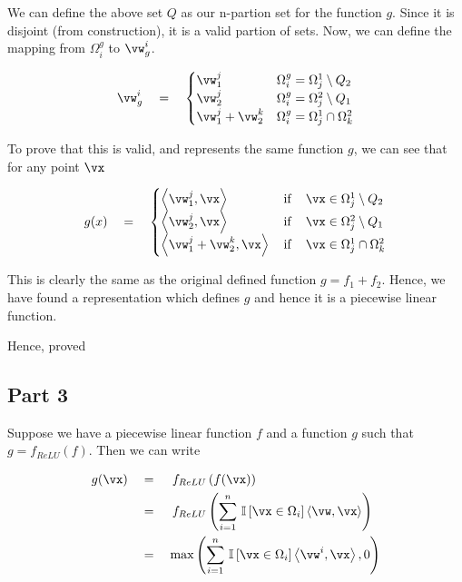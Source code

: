 \documentclass{article}
\begin{document}
\begin{mlsolution}
\begin{addmargin}{1.5em}
		 \br%

		We can define the above set $Q$ as our n-partion set for the function $g$. Since it is disjoint (from construction), it is a valid partion of sets. Now, we can define the mapping from $\Omega_i^g$ to $\vw_g^i$.

		\begin{align*}
			\vw_g^i	\eq \begin{cases}
				\vw_1^j				&	\Omega_i^g = \Omega_j^1 \setminus Q_2 \\
				\vw_2^j				&	\Omega_i^g = \Omega_j^2 \setminus Q_1 \\
				\vw_1^j + \vw_2^k	&	\Omega_i^g = \Omega_j^1 \cap \Omega_k^2
			\end{cases}
		\end{align*}

		To prove that this is valid, and represents the same function $g$, we can see that for any point $\vx$

		\begin{align*}
			g(x)	\eq	\begin{cases}
				\ip{\vw_1^j}{\vx}			&	\mt{if}\quad \vx \in \Omega_j^1 \setminus Q_2 \\
				\ip{\vw_2^j}{\vx}			&	\mt{if}\quad \vx \in \Omega_j^2 \setminus Q_1 \\
				\ip{\vw_1^j + \vw_2^k}{\vx}	&	\mt{if}\quad \vx \in \Omega_j^1 \cap \Omega_k^2
			\end{cases}
		\end{align*}

		This is clearly the same as the original defined function $g = f_1 + f_2$. Hence, we have found a representation which defines $g$ and hence it is a piecewise linear function. \br

		Hence, proved

	\end{addmargin}

	\subsection*{Part 3}
	\begin{addmargin}{1.5em}

		Suppose we have a piecewise linear function $f$ and a function $g$ such that $g = f_{ReLU}(f)$. Then we can write

		\begin{align*}
			g(\vx)	&\eq	\func{f_{ReLU}}{f(\vx)} \\
					&\eq	\func{f_{ReLU}}{\sum_{i = 1}^n \is{\vx \in \Omega_i} \ip{\vw}{\vx}} \\
					&\eq	\max\para{\sum_{i = 1}^n \is{\vx \in \Omega_i} \ip{\vw^i}{\vx}, 0}
		\end{align*}


\end{addmargin}
\end{mlsolution}
\end{document}
